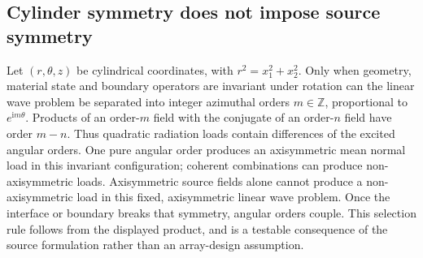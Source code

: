 \subsection{Cylinder symmetry does not impose source symmetry}
Let $(r,\theta,z)$ be cylindrical coordinates, with $r^2=x_1^2+x_2^2$.
Only when geometry, material state and boundary operators are invariant under
rotation can the linear wave problem be separated into integer azimuthal
orders $m\in\mathbb Z$, proportional to $e^{\mathrm i m\theta}$. Products
of an order-$m$ field with the conjugate of an order-$n$ field have order
$m-n$. Thus quadratic radiation loads contain differences of the excited
angular orders. One pure angular order produces an axisymmetric mean normal
load in this invariant configuration; coherent combinations can produce
non-axisymmetric loads. Axisymmetric source fields alone cannot produce a
non-axisymmetric load in this fixed, axisymmetric linear wave problem.
Once the interface or boundary breaks that symmetry, angular orders couple.
This selection rule follows from the displayed product, and is a testable
consequence of the source formulation rather than an array-design assumption.
